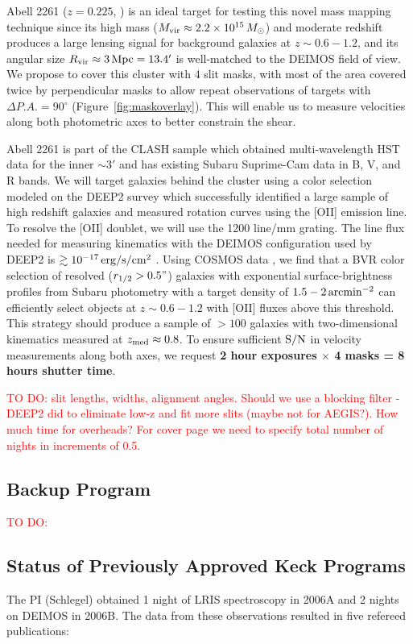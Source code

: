 \documentclass[12pt]{article}
\newcommand{\degr}{\ensuremath{^\circ}}
\begin{document}
Abell 2261 ($z=0.225$, \citealt{Coe2012}) is an ideal target for testing this novel mass mapping technique since its high mass ($M_{\rm vir}\approx 2.2 \times 10^{15}\,M_{\odot}$) and moderate redshift produces a large lensing signal for background galaxies at $z\sim0.6-1.2$, and its angular size $R_{\rm vir} \approx 3\,{\rm Mpc} = 13.4'$ is well-matched to the DEIMOS field of view. We propose to cover this cluster with 4 slit masks, with most of the area covered twice by perpendicular masks to allow repeat observations of targets with $\Delta P.A.=90\degr$ (Figure~\ref{fig:maskoverlay}). This will enable us to measure velocities along both photometric axes to better constrain the shear.

Abell 2261 is part of the CLASH sample \citep{Postman2012} which obtained multi-wavelength HST data for the inner $\sim3'$ and has existing Subaru Suprime-Cam data in B, V, and R bands. We will target galaxies behind the cluster using a color selection modeled on the DEEP2 survey \citep{Newman2013} which successfully identified a large sample of high redshift galaxies and measured rotation curves using the [OII] emission line. To resolve the [OII] doublet, we will use the 1200 line/mm grating. The line flux needed for measuring kinematics with the DEIMOS configuration used by DEEP2 is $\gtrsim10^{-17}\,{\rm erg/s/cm^2}$ \citep{Kassin2012}. Using COSMOS data \citep{Jouvel2009}, we find that a BVR color selection of resolved ($r_{1/2}>0.5"$) galaxies with exponential surface-brightness profiles from Subaru photometry with a target density of $1.5-2\,{\rm arcmin^{-2}}$ can efficiently select objects at $z\sim0.6-1.2$ with [OII] fluxes above this threshold. This strategy should produce a sample of $>100$ galaxies with two-dimensional kinematics measured at $z_{\rm med}\approx0.8$. To ensure sufficient ${\rm S/N}$ in velocity measurements along both axes, we request \textbf{2 hour exposures $\times$ 4 masks = 8 hours shutter time}.

\textcolor{Red}{TO DO: slit lengths, widths, alignment angles. Should we use a blocking filter - DEEP2 did to eliminate low-z and fit more slits (maybe not for AEGIS?). How much time for overheads? For cover page we need to specify total number of nights in increments of 0.5.}

\subsection{Backup Program}
\textcolor{Red}{TO DO:}

\subsection{Status of Previously Approved Keck Programs}
The PI (Schlegel) obtained 1 night of LRIS spectroscopy in 2006A and 2 nights on DEIMOS in 2006B. The data from these observations resulted in five refereed publications:
\end{document}
